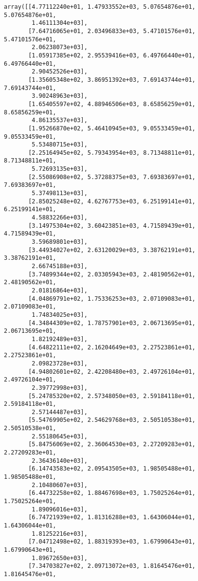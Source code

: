 \documentclass[11pt]{article}
\makeatletter
\newcommand{\boxspacing}{\kern\kvtcb@left@rule\kern\kvtcb@boxsep}
\newcommand{\prompt}[4]{
        {\ttfamily\llap{{\color{#2}[#3]:\hspace{3pt}#4}}\vspace{-\baselineskip}}
    }
\makeatother
\begin{document}
            \begin{tcolorbox}[breakable, size=fbox, boxrule=.5pt, pad at break*=1mm, opacityfill=0]
\prompt{Out}{outcolor}{27}{\boxspacing}
\begin{Verbatim}[commandchars=\\\{\}]
array([[4.77112240e+01, 1.47933552e+03, 5.07654876e+01, 5.07654876e+01,
        1.46111304e+03],
       [7.64716065e+01, 2.03496833e+03, 5.47101576e+01, 5.47101576e+01,
        2.06238073e+03],
       [1.05917385e+02, 2.95539416e+03, 6.49766440e+01, 6.49766440e+01,
        2.90452526e+03],
       [1.35605348e+02, 3.86951392e+03, 7.69143744e+01, 7.69143744e+01,
        3.90248963e+03],
       [1.65405597e+02, 4.88946506e+03, 8.65856259e+01, 8.65856259e+01,
        4.86135537e+03],
       [1.95266870e+02, 5.46410945e+03, 9.05533459e+01, 9.05533459e+01,
        5.53480715e+03],
       [2.25164945e+02, 5.79343954e+03, 8.71348811e+01, 8.71348811e+01,
        5.72693135e+03],
       [2.55086908e+02, 5.37288375e+03, 7.69383697e+01, 7.69383697e+01,
        5.37498113e+03],
       [2.85025248e+02, 4.62767753e+03, 6.25199141e+01, 6.25199141e+01,
        4.58832266e+03],
       [3.14975304e+02, 3.60423851e+03, 4.71589439e+01, 4.71589439e+01,
        3.59689801e+03],
       [3.44934027e+02, 2.63120029e+03, 3.38762191e+01, 3.38762191e+01,
        2.66745188e+03],
       [3.74899344e+02, 2.03305943e+03, 2.48190562e+01, 2.48190562e+01,
        2.01816864e+03],
       [4.04869791e+02, 1.75336253e+03, 2.07109083e+01, 2.07109083e+01,
        1.74834025e+03],
       [4.34844309e+02, 1.78757901e+03, 2.06713695e+01, 2.06713695e+01,
        1.82192489e+03],
       [4.64822111e+02, 2.16204649e+03, 2.27523861e+01, 2.27523861e+01,
        2.09823728e+03],
       [4.94802601e+02, 2.42208480e+03, 2.49726104e+01, 2.49726104e+01,
        2.39772998e+03],
       [5.24785320e+02, 2.57348050e+03, 2.59184118e+01, 2.59184118e+01,
        2.57144487e+03],
       [5.54769905e+02, 2.54629768e+03, 2.50510538e+01, 2.50510538e+01,
        2.55180645e+03],
       [5.84756069e+02, 2.36064530e+03, 2.27209283e+01, 2.27209283e+01,
        2.36436140e+03],
       [6.14743583e+02, 2.09543505e+03, 1.98505488e+01, 1.98505488e+01,
        2.10480607e+03],
       [6.44732258e+02, 1.88467698e+03, 1.75025264e+01, 1.75025264e+01,
        1.89096016e+03],
       [6.74721939e+02, 1.81316288e+03, 1.64306044e+01, 1.64306044e+01,
        1.81252216e+03],
       [7.04712498e+02, 1.88319393e+03, 1.67990643e+01, 1.67990643e+01,
        1.89672650e+03],
       [7.34703827e+02, 2.09713072e+03, 1.81645476e+01, 1.81645476e+01,

\end{Verbatim}
\end{tcolorbox}
\end{document}
